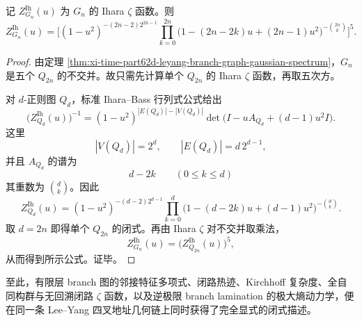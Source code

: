 \begin{theorem}\label{thm:xi-time-part62d-leyang-branch-ihara-zeta}
记 \(Z_{G_n}^{\mathrm{Ih}}(u)\) 为 \(G_n\) 的 Ihara \(\zeta\) 函数。则
\[
Z_{G_n}^{\mathrm{Ih}}(u)
=
\Biggl[
(1-u^2)^{-(2n-2)2^{2n-1}}
\prod_{k=0}^{2n}
\bigl(1-(2n-2k)u+(2n-1)u^2\bigr)^{-\binom{2n}{k}}
\Biggr]^5.
\]
\end{theorem}
\begin{proof}
由定理 \ref{thm:xi-time-part62d-leyang-branch-graph-gaussian-spectrum}，\(G_n\) 是五个 \(Q_{2n}\) 的不交并。故只需先计算单个 \(Q_{2n}\) 的 Ihara \(\zeta\) 函数，再取五次方。

对 \(d\)-正则图 \(Q_d\)，标准 Ihara--Bass 行列式公式给出
\[
\bigl(Z_{Q_d}^{\mathrm{Ih}}(u)\bigr)^{-1}
=
(1-u^2)^{|E(Q_d)|-|V(Q_d)|}
\det\!\bigl(I-uA_{Q_d}+(d-1)u^2I\bigr).
\]
这里
\[
|V(Q_d)|=2^d,
\qquad
|E(Q_d)|=d\,2^{d-1},
\]
并且 \(A_{Q_d}\) 的谱为
\[
d-2k
\qquad(0\le k\le d)
\]
其重数为 \(\binom{d}{k}\)。因此
\[
Z_{Q_d}^{\mathrm{Ih}}(u)
=
(1-u^2)^{-(d-2)2^{d-1}}
\prod_{k=0}^{d}
\bigl(1-(d-2k)u+(d-1)u^2\bigr)^{-\binom{d}{k}}.
\]
取 \(d=2n\) 即得单个 \(Q_{2n}\) 的闭式。再由 Ihara \(\zeta\) 对不交并取乘法，
\[
Z_{G_n}^{\mathrm{Ih}}(u)=\bigl(Z_{Q_{2n}}^{\mathrm{Ih}}(u)\bigr)^5,
\]
从而得到所示公式。证毕。
\end{proof}

\noindent
至此，有限层 branch 图的邻接特征多项式、闭路热迹、Kirchhoff 复杂度、全自同构群与无回溯闭路 \(\zeta\) 函数，以及逆极限 branch lamination 的极大熵动力学，便在同一条 Lee--Yang 四叉地址几何链上同时获得了完全显式的闭式描述。

\endinput
